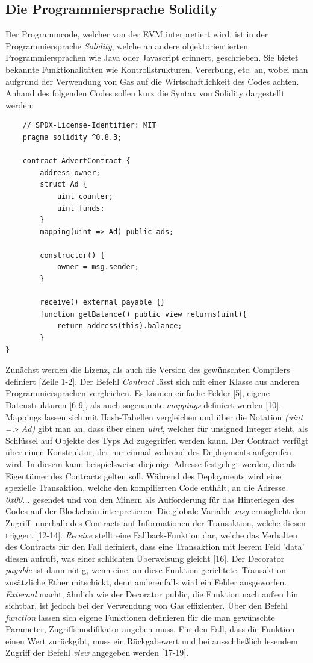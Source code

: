 \subsection{Die Programmiersprache Solidity}
Der Programmcode, welcher von der EVM interpretiert wird, ist in der Programmiersprache \emph{Solidity}, welche an andere objektorientierten Programmiersprachen wie Java oder Javascript erinnert, geschrieben. Sie bietet bekannte Funktionalitäten wie Kontrollstrukturen, Vererbung, etc. an, wobei man aufgrund der Verwendung von Gas auf die Wirtschaftlichkeit des Codes achten. Anhand des folgenden Codes sollen kurz die Syntax von Solidity dargestellt werden: 
\begin{lstlisting}
	// SPDX-License-Identifier: MIT
	pragma solidity ^0.8.3;
	
	contract AdvertContract {
		address owner;
		struct Ad {
			uint counter;
			uint funds;
		}
		mapping(uint => Ad) public ads;
		
		constructor() {
			owner = msg.sender;
		}
	
		receive() external payable {}
		function getBalance() public view returns(uint){
			return address(this).balance;
		}
}
	\end{lstlisting}
Zunächst werden die Lizenz, als auch die Version des gewünschten Compilers definiert [Zeile 1-2]. Der Befehl \emph{Contract} lässt sich mit einer Klasse aus anderen Programmiersprachen vergleichen. 
Es können einfache Felder [5], eigene Datenstrukturen [6-9], als auch sogenannte \emph{mappings} definiert werden [10]. Mappings lassen sich mit Hash-Tabellen vergleichen und über die Notation \emph{(uint => Ad)} gibt man an, dass über einen \emph{uint}, welcher für unsigned Integer steht, als Schlüssel auf Objekte des Typs Ad zugegriffen werden kann. 
Der Contract verfügt über einen Konstruktor, der nur einmal während des Deployments aufgerufen wird. In diesem kann beispielsweise diejenige Adresse festgelegt werden, die als Eigentümer des Contracts gelten soll. 
Während des Deployments wird eine spezielle Transaktion, welche den kompilierten Code enthält, an die Adresse \emph{0x00...} gesendet und von den Minern als Aufforderung für das Hinterlegen des Codes auf der Blockchain interpretieren. 
Die globale Variable \emph{msg} ermöglicht den Zugriff innerhalb des Contracts auf Informationen der Transaktion, welche diesen triggert [12-14].
\emph{Receive} stellt eine Fallback-Funktion dar, welche das Verhalten des Contracts für den Fall definiert, dass eine Transaktion mit leerem Feld 'data' diesen aufruft, was einer schlichten Überweisung gleicht [16]. Der Decorator \emph{payable} ist dann nötig, wenn eine, an diese Funktion gerichtete, Transaktion zusätzliche Ether mitschickt, denn anderenfalls wird ein Fehler ausgeworfen. \emph{External} macht, ähnlich wie der Decorator public, die Funktion nach außen hin sichtbar, ist jedoch bei der Verwendung von Gas effizienter. Über den Befehl \emph{function} lassen sich eigene Funktionen definieren für die man gewünschte Parameter, Zugriffsmodifikator angeben muss. Für den Fall, dass die Funktion einen Wert zurückgibt, muss ein Rückgabewert und bei ausschließlich lesendem Zugriff der Befehl \emph{view} angegeben werden [17-19]. 
